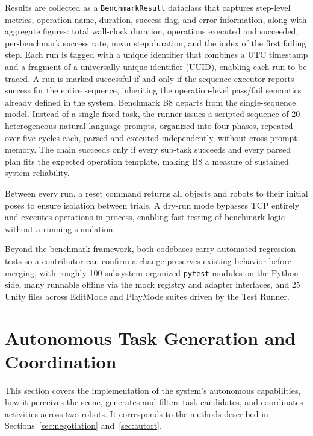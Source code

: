 Results are collected as a \texttt{BenchmarkResult} dataclass that captures step-level metrics, operation name, duration, success flag, and error information, along with aggregate figures: total wall-clock duration, operations executed and succeeded, per-benchmark success rate, mean step duration, and the index of the first failing step. Each run is tagged with a unique identifier that combines a UTC timestamp and a fragment of a universally unique identifier (UUID), enabling each run to be traced. A run is marked successful if and only if the sequence executor reports success for the entire sequence, inheriting the operation-level pass/fail semantics already defined in the system. Benchmark B8 departs from the single-sequence model. Instead of a single fixed task, the runner issues a scripted sequence of 20 heterogeneous natural-language prompts, organized into four phases, repeated over five cycles each, parsed and executed independently, without cross-prompt memory. The chain succeeds only if every sub-task succeeds and every parsed plan fits the expected operation template, making B8 a measure of sustained system reliability.

Between every run, a reset command returns all objects and robots to their initial poses to ensure isolation between trials. A dry-run mode bypasses TCP entirely and executes operations in-process, enabling fast testing of benchmark logic without a running simulation.

Beyond the benchmark framework, both codebases carry automated regression tests so a contributor can confirm a change preserves existing behavior before merging, with roughly 100 subsystem-organized \texttt{pytest} modules on the Python side, many runnable offline via the mock registry and adapter interfaces, and 25 Unity files across EditMode and PlayMode suites driven by the Test Runner.

\section{Autonomous Task Generation and Coordination}\label{sec:autort-impl}
This section covers the implementation of the system’s autonomous capabilities, how it perceives the scene, generates and filters task candidates, and coordinates activities across two robots. It corresponds to the methods described in Sections~\ref{sec:negotiation} and~\ref{sec:autort}.

